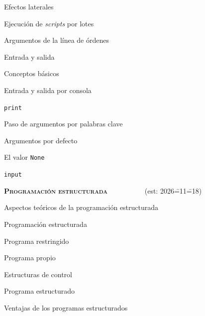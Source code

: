 \begin{longenum}
\begin{longenum}
\begin{longenum}
            \item Efectos laterales
            \item Ejecución de \textit{scripts} por lotes
            \begin{longenum}
                \item Argumentos de la línea de órdenes
            \end{longenum}
        \end{longenum}
        \item Entrada y salida
        \begin{longenum}
            \item Conceptos básicos
            \item Entrada y salida por consola
            \begin{longenum}
                \item \texttt{print}
                \begin{longenum}
                    \item Paso de argumentos por palabras clave
                    \item Argumentos por defecto
                    \item El valor \texttt{None}
                \end{longenum}
                \item \texttt{input}
            \end{longenum}
        \end{longenum}
    \end{longenum}
    \item \textbf{\textsc{Programación estructurada}} \ \ \ \ \ \ \ \ \ \ (est: 2026\==11\==18)
    \begin{longenum}
        \item Aspectos teóricos de la programación estructurada
        \begin{longenum}
            \item Programación estructurada
            \item Programa restringido
            \item Programa propio
            \item Estructuras de control
            \item Programa estructurado
            \begin{longenum}
                \item Ventajas de los programas estructurados

\end{longenum}
\end{longenum}
\end{longenum}
\end{longenum}
